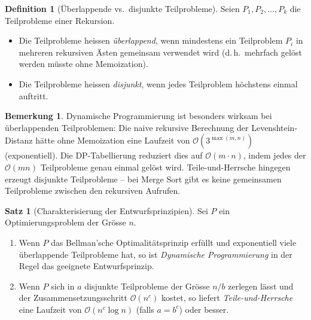 ﻿\documentclass[a4paper,12pt]{article}
\theoremstyle{definition}
\newtheorem{definition}{Definition}
\newtheorem{satz}{Satz}
\newtheorem{bemerkung}{Bemerkung}
\begin{document}
\begin{definition}[Überlappende vs.\ disjunkte Teilprobleme]
    Seien $P_1, P_2, \ldots, P_k$ die Teilprobleme einer Rekursion.
    \begin{itemize}
        \item Die Teilprobleme heissen \emph{überlappend}, wenn
              mindestens ein Teilproblem $P_i$ in mehreren rekursiven Ästen
              gemeinsam verwendet wird (d.\,h.\ mehrfach gelöst werden müsste
              ohne Memoization).
        \item Die Teilprobleme heissen \emph{disjunkt}, wenn jedes
              Teilproblem höchstens einmal auftritt.
    \end{itemize}
\end{definition}

\begin{bemerkung}
    Dynamische Programmierung ist besonders wirksam bei überlappenden
    Teilproblemen: Die naive rekursive Berechnung der Levenshtein-Distanz
    hätte ohne Memoization eine Laufzeit von $\mathcal{O}(3^{\max(m,n)})$
    (exponentiell). Die DP-Tabellierung reduziert dies auf $\mathcal{O}(m \cdot n)$,
    indem jedes der $\mathcal{O}(mn)$ Teilprobleme genau einmal gelöst wird.
    Teile-und-Herrsche hingegen erzeugt disjunkte Teilprobleme -- bei Merge Sort
    gibt es keine gemeinsamen Teilprobleme zwischen den rekursiven Aufrufen.
\end{bemerkung}

\begin{satz}[Charakterisierung der Entwurfsprinzipien]
    \label{satz:paradigmen}
    Sei $P$ ein Optimierungsproblem der Grösse $n$.
    \begin{enumerate}
        \item Wenn $P$ das Bellman'sche Optimalitätsprinzip erfüllt und
              exponentiell viele überlappende Teilprobleme hat, so ist
              \emph{Dynamische Programmierung} in der Regel das geeignete
              Entwurfsprinzip.
        \item Wenn $P$ sich in $a$ disjunkte Teilprobleme der Grösse $n/b$
              zerlegen lässt und der Zusammensetzungsschritt
              $\mathcal{O}(n^c)$ kostet, so liefert \emph{Teile-und-Herrsche}
              eine Laufzeit von $\mathcal{O}(n^c \log n)$ (falls $a = b^c$)
              oder besser.
    \end{enumerate}
\end{satz}

\end{document}
